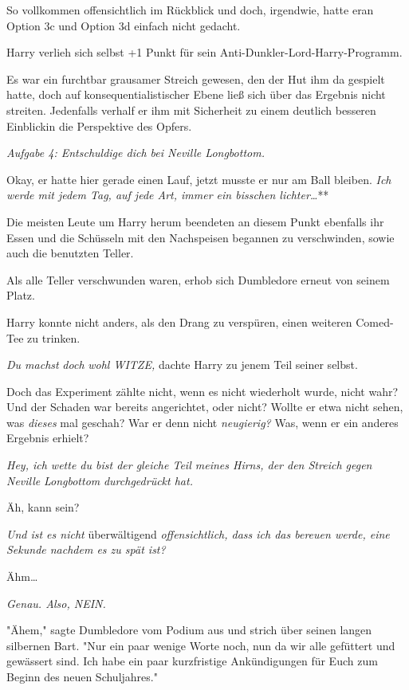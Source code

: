 {So vollkommen offensichtlich im Rückblick und doch, irgendwie, hatte eran Option 3c und Option 3d einfach nicht gedacht.

Harry verlieh sich selbst +1 Punkt für sein Anti-Dunkler-Lord-Harry-Programm.

Es war ein furchtbar grausamer Streich gewesen, den der Hut ihm da gespielt hatte, doch auf konsequentialistischer Ebene ließ sich über das Ergebnis nicht streiten. Jedenfalls verhalf er ihm mit Sicherheit zu einem deutlich besseren Einblickin die Perspektive des Opfers.

\emph{Aufgabe 4: Entschuldige dich bei Neville Longbottom.}

Okay, er hatte hier gerade einen Lauf, jetzt musste er nur am Ball bleiben. \emph{Ich werde mit jedem Tag, auf jede Art, immer ein bisschen lichter…}**

Die meisten Leute um Harry herum beendeten an diesem Punkt ebenfalls ihr Essen und die Schüsseln mit den Nachspeisen begannen zu verschwinden, sowie auch die benutzten Teller.

Als alle Teller verschwunden waren, erhob sich Dumbledore erneut von seinem Platz.

Harry konnte nicht anders, als den Drang zu verspüren, einen weiteren Comed-Tee zu trinken.

\emph{Du machst} \emph{doch} \emph{wohl WITZE,} dachte Harry zu jenem Teil seiner selbst.

Doch das Experiment zählte nicht, wenn es nicht wiederholt wurde, nicht wahr? Und der Schaden war bereits angerichtet, oder nicht? Wollte er etwa nicht sehen, was \emph{dieses} mal geschah? War er denn nicht \emph{neugierig?} Was, wenn er ein anderes Ergebnis erhielt?

\emph{Hey, ich wette du bist der gleiche Teil meines Hirns, der den Streich gegen Neville} \emph{Longbottom} \emph{durchgedrückt hat.}

Äh, kann sein?

\emph{Und ist es nicht} überwältigend \emph{offensichtlich, dass ich das bereuen werde, eine Sekunde nachdem es zu spät ist?}

Ähm…

\emph{Genau. Also, NEIN.}

"Ähem," sagte Dumbledore vom Podium aus und strich über seinen langen silbernen Bart. "Nur ein paar wenige Worte noch, nun da wir alle gefüttert und gewässert sind. Ich habe ein paar kurzfristige Ankündigungen für Euch zum Beginn des neuen Schuljahres."

}
